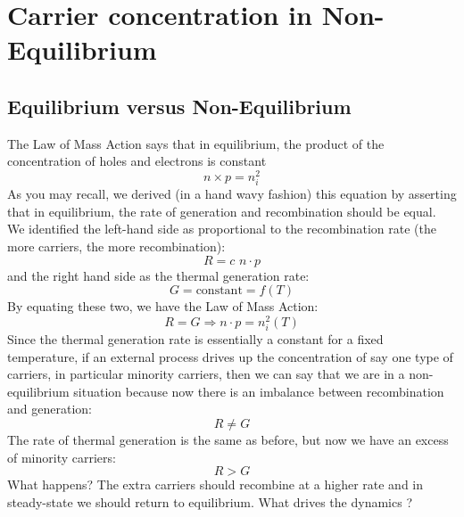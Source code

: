 \section{Carrier concentration in Non-Equilibrium}
\subsection{Equilibrium versus Non-Equilibrium}
The Law of Mass Action says that in equilibrium, the product of the concentration of holes and electrons is constant
    \begin{equation}
        n \times p = n_i^2
    \end{equation}
As you may recall, we derived (in a hand wavy fashion) this equation by asserting that in equilibrium, the rate of generation and recombination should be equal.  We identified the left-hand side as proportional to the recombination rate (the more carriers, the more recombination):
    \begin{equation}
        R = c\,\, n \cdot p 
    \end{equation}
and the right hand side as the thermal generation rate:
    \begin{equation}
        G = \text{constant} = f(T) 
    \end{equation}
By equating these two, we have the Law of Mass Action:
    \begin{equation}
        R = G \Rightarrow n \cdot p = n_i^2(T) 
    \end{equation}
Since the thermal generation rate is essentially a constant for a fixed temperature, if an external process drives up the concentration of say one type of carriers, in particular minority carriers, then we can say that we are in a non-equilibrium situation because now there is an imbalance between recombination and generation:  
    \begin{equation}
        R \ne G 
    \end{equation}
The rate of thermal generation is the same as before, but now we have an excess of minority carriers: 
    \begin{equation}
        R > G 
    \end{equation}
What happens? The extra carriers should recombine at a higher rate and in steady-state we should return to equilibrium.  What drives the dynamics ?
